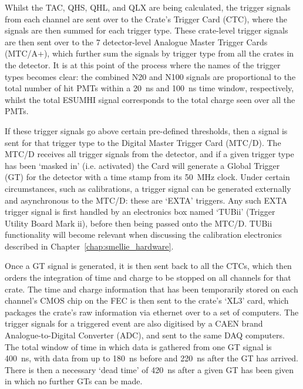 Whilst the TAC, QHS, QHL, and QLX are being calculated, the trigger signals from each channel are sent over to the Crate's Trigger Card (CTC), where the signals are then summed for each trigger type. These crate-level trigger signals are then sent over to the 7 detector-level Analogue Master Trigger Cards (MTC/A+), which further sum the signals by trigger type from all the crates in the detector. It is at this point of the process where the names of the trigger types becomes clear: the combined N20 and N100 signals are proportional to the total number of hit PMTs within a \SI{20}{\ns} and \SI{100}{\ns} time window, respectively, whilst the total ESUMHI signal corresponds to the total charge seen over all the PMTs.

If these trigger signals go above certain pre-defined thresholds, then a signal is sent for that trigger type to the Digital Master Trigger Card (MTC/D). The MTC/D receives all trigger signals from the detector, and if a given trigger type has been `masked in' (i.e. activated) the Card will generate a Global Trigger (GT) for the detector with a time stamp from its \SI{50}{\MHz} clock. Under certain circumstances, such as calibrations, a trigger signal can be generated externally and asynchronous to the MTC/D: these are `EXTA' triggers. Any such EXTA trigger signal is first handled by an electronics box named `TUBii' (Trigger Utility Board Mark ii), before then being passed onto the MTC/D. TUBii functionality will become relevant when discussing the calibration electronics described in Chapter~\ref{chap:smellie_hardware}.

Once a GT signal is generated, it is then sent back to all the CTCs, which then orders the integration of time and charge to be stopped on all channels for that crate. The time and charge information that has been temporarily stored on each channel's CMOS chip on the FEC is then sent to the crate's `XL3' card, which packages the crate's raw information via ethernet over to a set of computers. The trigger signals for a triggered event are also digitised by a CAEN brand Analogue-to-Digital Converter (ADC), and sent to the same DAQ computers. The total window of time in which data is gathered from one GT signal is \SI{400}{\ns}, with data from up to \SI{180}{\ns} before and \SI{220}{\ns} after the GT has arrived. There is then a necessary `dead time' of \SI{420}{\ns} after a given GT has been given in which no further GTs can be made.

